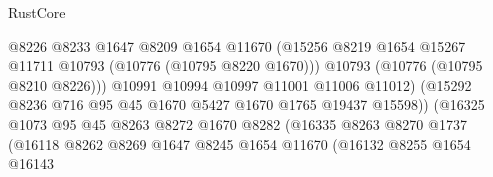 \begin{lexlean}{RustCore}
\begin{coremodule}
                                          @8226
                                          @8233
                                          @1647
                                          @8209
                                          @1654
                                          @11670
                                          (@15256
                                            @8219
                                            @1654
                                            @15267
                                            @11711
                                            @10793
                                            (@10776 (@10795 @8220 @1670)))
                                          @10793
                                          (@10776 (@10795 @8210 @8226)))
                                        @10991
                                        @10994
                                        @10997
                                        @11001
                                        @11006
                                        @11012)
                                      (@15292
                                        @8236
                                        @716
                                        @95
                                        @45
                                        @1670
                                        @5427
                                        @1670
                                        @1765
                                        @19437
                                        @15598))
                                    (@16325
                                      @1073
                                      @95
                                      @45
                                      @8263
                                      @8272
                                      @1670
                                      @8282
                                      (@16335
                                        @8263
                                        @8270
                                        @1737
                                        (@16118
                                          @8262
                                          @8269
                                          @1647
                                          @8245
                                          @1654
                                          @11670
                                          (@16132
                                            @8255
                                            @1654
                                            @16143

\end{coremodule}
\end{lexlean}
